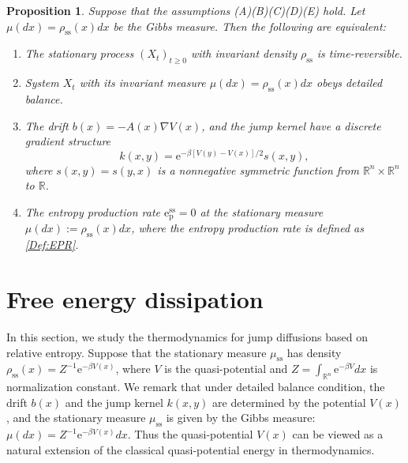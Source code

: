 \documentclass[10pt]{article}
\newtheorem{prop}[thm]{Proposition}
\theoremstyle{definition}
\numberwithin{equation}{section}
\begin{document}
\begin{prop}\label{TSeq}
Suppose that the assumptions (A)(B)(C)(D)(E) hold.
Let $\mu(dx) = \rho_\mathrm{ss}(x)dx$ be the Gibbs measure.
Then the following are equivalent: 
\begin{enumerate}
    \item The stationary process $(X_t)_{t\geq 0}$ with invariant density $\rho_\mathrm{ss}$ is time-reversible.
    \item System $X_t$ with its invariant measure $\mu(dx)=\rho_\mathrm{ss}(x)dx$ obeys detailed balance.
    \item The drift $b(x) = -A(x)\nabla V(x)$, and the jump kernel have a discrete gradient structure
    \begin{equation*}
         k(x,y) = \mathrm{e}^{-\beta[V(y)-V(x)]/2} s(x,y),
    \end{equation*}
    where $s(x,y) = s(y,x)$ is a nonnegative symmetric function from $\mathbb{R}^n \times \mathbb{R}^n$ to $\mathbb{R}$.
    \item The entropy production rate $\mathrm{e}^\mathrm{ss}_\mathrm{p} = 0$ at the stationary measure $\mu(dx) :=\rho_\mathrm{ss}(x)dx$, where the entropy production rate is defined as \eqref{Def:EPR}.
\end{enumerate}
\end{prop}

\section{Free energy dissipation}\label{Sec3}

In this section, we study the thermodynamics for jump diffusions based on relative entropy. 
Suppose that the stationary measure $\mu_\mathrm{ss}$ has density $\rho_\mathrm{ss}(x) = Z^{-1}\mathrm{e}^{-\beta V(x)}$, where $V$ is the quasi-potential and $Z=\int_{\mathbb{R}^n}\mathrm{e}^{-\beta V}dx$ is normalization constant. We remark that under detailed balance condition, the drift $b(x)$ and the jump kernel $k(x,y)$ are determined by the potential $V(x)$, 
and the stationary measure $\mu_\mathrm{ss}$ is given by the Gibbs measure: $\mu(dx) = Z^{-1} \mathrm{e}^{-\beta V(x)}dx$.
Thus the quasi-potential $V(x)$ can be viewed as a natural extension of the classical quasi-potential energy in thermodynamics.
\end{document}

